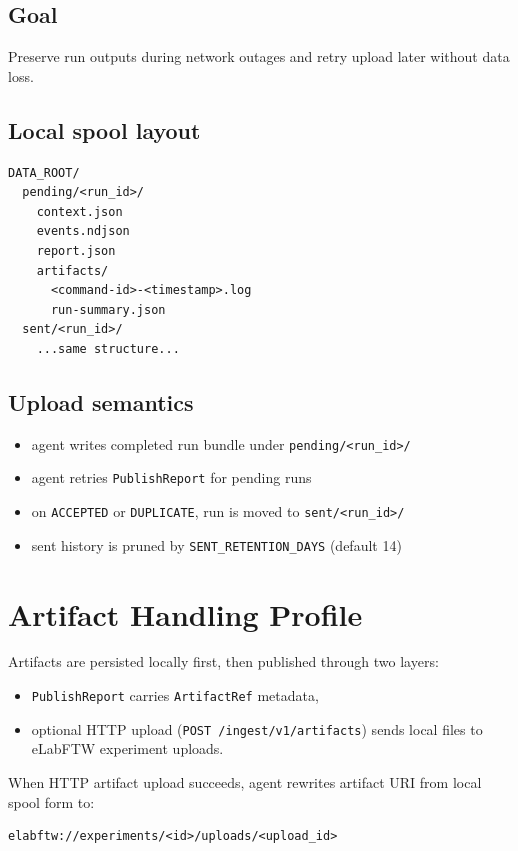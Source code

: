\documentclass[11pt,a4paper]{article}
\begin{document}
\subsection{Goal}
Preserve run outputs during network outages and retry upload later without data loss.

\subsection{Local spool layout}
\begin{verbatim}
DATA_ROOT/
  pending/<run_id>/
    context.json
    events.ndjson
    report.json
    artifacts/
      <command-id>-<timestamp>.log
      run-summary.json
  sent/<run_id>/
    ...same structure...
\end{verbatim}

\subsection{Upload semantics}
\begin{itemize}
  \item agent writes completed run bundle under \texttt{pending/<run\_id>/}
  \item agent retries \texttt{PublishReport} for pending runs
  \item on \texttt{ACCEPTED} or \texttt{DUPLICATE}, run is moved to \texttt{sent/<run\_id>/}
  \item sent history is pruned by \texttt{SENT\_RETENTION\_DAYS} (default 14)
\end{itemize}

\section{Artifact Handling Profile}
Artifacts are persisted locally first, then published through two layers:
\begin{itemize}
  \item \texttt{PublishReport} carries \texttt{ArtifactRef} metadata,
  \item optional HTTP upload (\texttt{POST /ingest/v1/artifacts}) sends local files to eLabFTW experiment uploads.
\end{itemize}

When HTTP artifact upload succeeds, agent rewrites artifact URI from local spool form to:
\begin{verbatim}
elabftw://experiments/<id>/uploads/<upload_id>
\end{verbatim}
\end{document}
